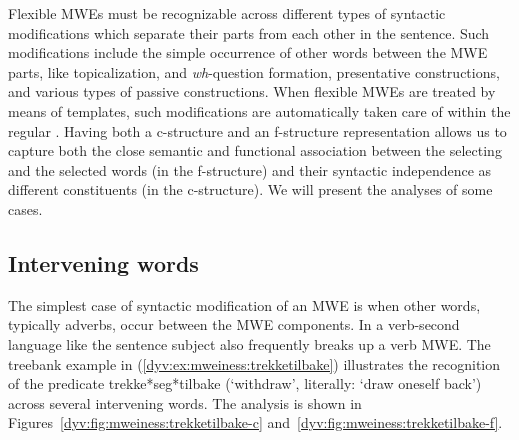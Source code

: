 \documentclass[output=paper]{langsci/langscibook}
\begin{document}
%
%


Flexible MWEs must be recognizable across different types of syntactic modifications which separate their parts from each other in the sentence.
Such modifications include the simple occurrence of other words between the MWE parts,  like topicalization,  and \textit{wh}-question formation, presentative constructions, and various types of passive constructions.
When flexible MWEs are treated by means of  templates, such modifications are automatically taken care of within the regular .
Having both a c-structure and an f-structure representation allows us to capture both the close semantic and functional association between the selecting and the selected words (in the f-structure) and their syntactic independence as different constituents (in the c-structure).
We will present the analyses of some cases.

\subsection{Intervening words}

The simplest case of syntactic modification of an MWE is when other words, typically adverbs, occur between the MWE components.
In a verb-second language like  the sentence subject also frequently breaks up a verb  MWE.
The treebank example in (\ref{dyv:ex:mweiness:trekketilbake})  illustrates the recognition of the predicate \textsf{trekke*seg*tilbake} (`withdraw', literally: `draw oneself back') across several intervening words.
The analysis is shown in Figures~\ref{dyv:fig:mweiness:trekketilbake-c} and~\ref{dyv:fig:mweiness:trekketilbake-f}. 
\end{document}
